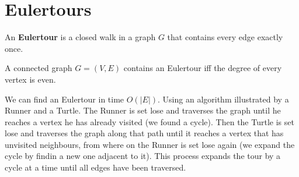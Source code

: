 \section{Eulertours}

\begin{definition}

    An \textbf{Eulertour} is a closed walk in a graph $G$ that contains every edge exactly once.
    
\end{definition}

\begin{theorem}

    A connected graph $G = (V, E)$ contains an Eulertour iff the degree of every vertex is even.
    
\end{theorem}

    We can find an Eulertour in time $O(|E|)$. Using an algorithm illustrated by a Runner and a Turtle. The
    Runner is set lose and traverses the graph until he reaches a vertex he has already visited (we found a
    cycle). Then the Turtle
    is set lose and traverses the graph along that path until it reaches a vertex that has unvisited neighbours,
    from where on the Runner is set lose again (we expand the cycle by findin a new one adjacent to it). This
    process expands the tour by a cycle at a time until all
    edges have been traversed.
        